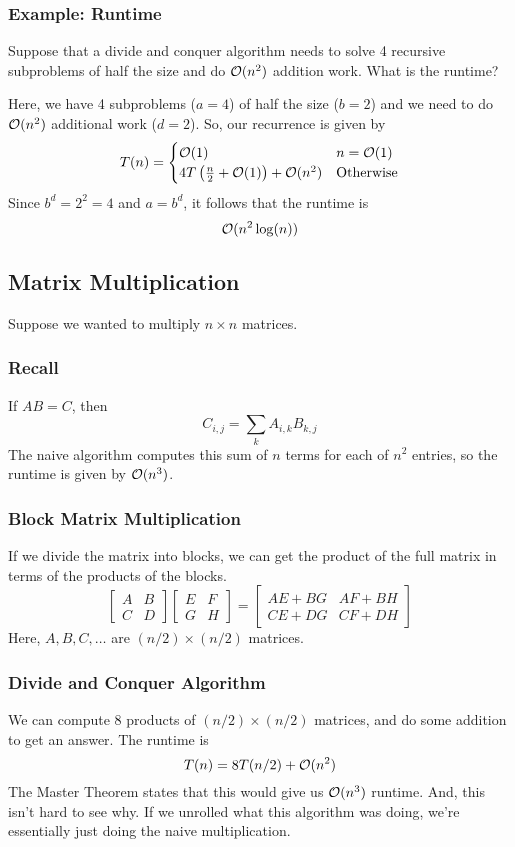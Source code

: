 \documentclass[letterpaper]{article}
\begin{document}
\subsubsection{Example: Runtime}
Suppose that a divide and conquer algorithm needs to solve 4 recursive subproblems of half the size and do $\mathcal{O}(n^2)$ addition work. What is the runtime? 
\begin{mdframed}[]
    Here, we have 4 subproblems ($a = 4$) of half the size ($b = 2$) and we need to do $\mathcal{O}(n^2)$ additional work ($d = 2$). So, our recurrence is given by 
    \[T(n) = \begin{cases}
        \mathcal{O}(1) & n = \mathcal{O}(1) \\ 
        4T\left(\frac{n}{2} + \mathcal{O}(1)\right) + \mathcal{O}(n^2) & \text{Otherwise}
    \end{cases}\]
    Since $b^d = 2^2 = 4$ and $a = b^d$, it follows that the runtime is 
    \[\mathcal{O}(n^2 \log(n))\]
\end{mdframed}


\subsection{Matrix Multiplication}
Suppose we wanted to multiply $n \times n$ matrices.

\subsubsection{Recall}
If $AB = C$, then 
\[C_{i, j} = \sum_{k} A_{i, k} B_{k, j}\]
The naive algorithm computes this sum of $n$ terms for each of $n^2$ entries, so the runtime is given by $\mathcal{O}(n^3)$.

\subsubsection{Block Matrix Multiplication}
If we divide the matrix into blocks, we can get the product of the full matrix in terms of the products of the blocks. 
\[
    \begin{bmatrix}
        A & B \\ C & D
    \end{bmatrix} \begin{bmatrix}
        E & F \\ G & H
    \end{bmatrix} = \begin{bmatrix}
        AE + BG & AF + BH \\ 
        CE + DG & CF + DH 
    \end{bmatrix}
\]
Here, $A, B, C, \dots$ are $(n / 2) \times (n / 2)$ matrices. 

\subsubsection{Divide and Conquer Algorithm}
We can compute 8 products of $(n / 2) \times (n / 2)$ matrices, and do some addition to get an answer. The runtime is 
\[T(n) = 8T(n / 2) + \mathcal{O}(n^2)\]
The Master Theorem states that this would give us $\mathcal{O}(n^3)$ runtime. And, this isn't hard to see why. If we unrolled what this algorithm was doing, we're essentially just doing the naive multiplication.
\end{document}
